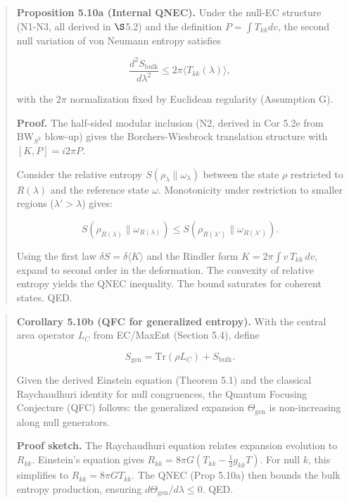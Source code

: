 \documentclass[11pt,a4paper]{article}
\theoremstyle{remark}
\begin{document}
\begin{quote}
\textbf{Proposition 5.10a (Internal QNEC).} Under the null-EC structure (N1-N3,
all derived in \ensuremath{\S}5.2) and the definition \(P = \int T_{kk} dv\), the second
null variation of von Neumann entropy satisfies

\[
\frac{d^2 S_{\mathrm{bulk}}}{d\lambda^2} \le 2\pi \langle T_{kk}(\lambda) \rangle,
\]

with the \(2\pi\) normalization fixed by Euclidean regularity (Assumption G).

\textbf{Proof.} The half-sided modular inclusion (N2, derived in Cor 5.2e from
BW\(_{S^2}\) blow-up) gives the Borchers-Wiesbrock translation structure with
\([K, P] = i 2\pi P\).

Consider the relative entropy \(S(\rho_\lambda \| \omega_\lambda)\) between the
state \(\rho\) restricted to \(R(\lambda)\) and the reference state \(\omega\).
Monotonicity under restriction to smaller regions (\(\lambda' > \lambda\)) gives:

\[
S(\rho_{R(\lambda)} \| \omega_{R(\lambda)}) \le S(\rho_{R(\lambda')} \| \omega_{R(\lambda')}).
\]

Using the first law \(\delta S = \delta \langle K \rangle\) and the Rindler form
\(K = 2\pi \int v \, T_{kk} \, dv\), expand to second order in the deformation.
The convexity of relative entropy yields the QNEC inequality. The bound
saturates for coherent states. QED.
\end{quote}

\begin{quote}
\textbf{Corollary 5.10b (QFC for generalized entropy).} With the central area
operator \(L_C\) from EC/MaxEnt (Section 5.4), define

\[
S_{\mathrm{gen}} = \mathrm{Tr}(\rho L_C) + S_{\mathrm{bulk}}.
\]

Given the derived Einstein equation (Theorem 5.1) and the classical
Raychaudhuri identity for null congruences, the Quantum Focusing Conjecture
(QFC) follows: the generalized expansion \(\Theta_{\mathrm{gen}}\) is
non-increasing along null generators.

\textbf{Proof sketch.} The Raychaudhuri equation relates expansion evolution to
\(R_{kk}\). Einstein's equation gives \(R_{kk} = 8\pi G (T_{kk} - \frac{1}{2}g_{kk}T)\).
For null \(k\), this simplifies to \(R_{kk} = 8\pi G T_{kk}\). The QNEC
(Prop 5.10a) then bounds the bulk entropy production, ensuring
\(d\Theta_{\mathrm{gen}}/d\lambda \le 0\). QED.
\end{quote}
\end{document}
